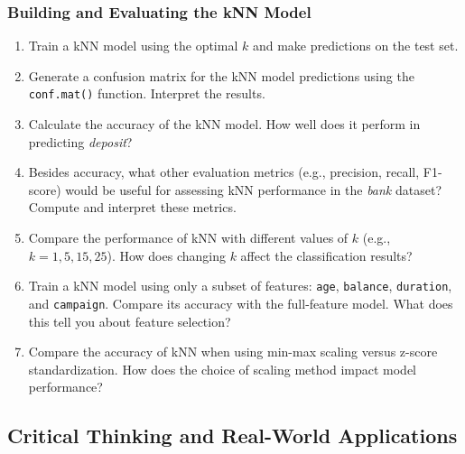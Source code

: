 \documentclass[
]{book}
\newcommand{\passthrough}[1]{#1}
\providecommand{\tightlist}{%
  \setlength{\itemsep}{0pt}\setlength{\parskip}{0pt}}
\theoremstyle{definition}
\theoremstyle{definition}
\theoremstyle{definition}
\theoremstyle{definition}
\theoremstyle{remark}
\begin{document}
\subsubsection*{Building and Evaluating the kNN Model}\label{building-and-evaluating-the-knn-model}

\begin{enumerate}
\def\labelenumi{\arabic{enumi}.}
\setcounter{enumi}{19}
\tightlist
\item
  Train a kNN model using the optimal \(k\) and make predictions on the test set.\\
\item
  Generate a confusion matrix for the kNN model predictions using the \passthrough{\lstinline!conf.mat()!} function. Interpret the results.\\
\item
  Calculate the accuracy of the kNN model. How well does it perform in predicting \emph{deposit}?\\
\item
  Besides accuracy, what other evaluation metrics (e.g., precision, recall, F1-score) would be useful for assessing kNN performance in the \emph{bank} dataset? Compute and interpret these metrics.\\
\item
  Compare the performance of kNN with different values of \(k\) (e.g., \(k = 1, 5, 15, 25\)). How does changing \(k\) affect the classification results?\\
\item
  Train a kNN model using only a subset of features: \passthrough{\lstinline!age!}, \passthrough{\lstinline!balance!}, \passthrough{\lstinline!duration!}, and \passthrough{\lstinline!campaign!}. Compare its accuracy with the full-feature model. What does this tell you about feature selection?\\
\item
  Compare the accuracy of kNN when using min-max scaling versus z-score standardization. How does the choice of scaling method impact model performance?
\end{enumerate}

\subsection*{Critical Thinking and Real-World Applications}\label{critical-thinking-and-real-world-applications}
\end{document}
